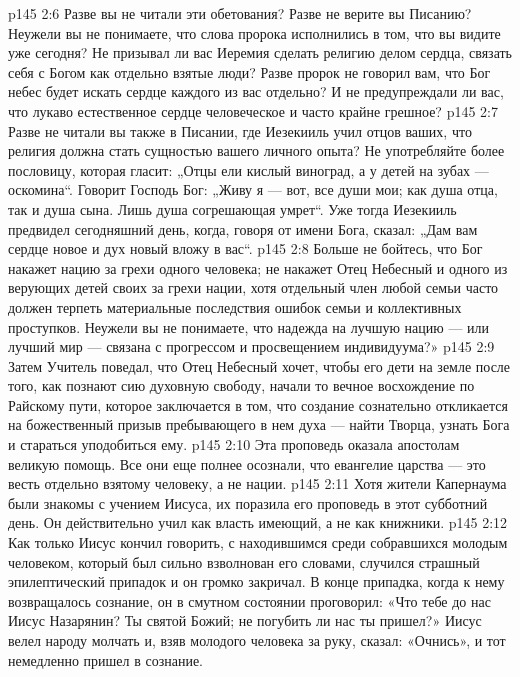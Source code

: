 \vs p145 2:6 Разве вы не читали эти обетования? Разве не верите вы Писанию? Неужели вы не понимаете, что слова пророка исполнились в том, что вы видите уже сегодня? Не призывал ли вас Иеремия сделать религию делом сердца, связать себя с Богом как отдельно взятые люди? Разве пророк не говорил вам, что Бог небес будет искать сердце каждого из вас отдельно? И не предупреждали ли вас, что лукаво естественное сердце человеческое и часто крайне грешное?
\vs p145 2:7 Разве не читали вы также в Писании, где Иезекииль учил отцов ваших, что религия должна стать сущностью вашего личного опыта? Не употребляйте более пословицу, которая гласит: „Отцы ели кислый виноград, а у детей на зубах --- оскомина“. Говорит Господь Бог: „Живу я --- вот, все души мои; как душа отца, так и душа сына. Лишь душа согрешающая умрет“. Уже тогда Иезекииль предвидел сегодняшний день, когда, говоря от имени Бога, сказал: „Дам вам сердце новое и дух новый вложу в вас“.
\vs p145 2:8 Больше не бойтесь, что Бог накажет нацию за грехи одного человека; не накажет Отец Небесный и одного из верующих детей своих за грехи нации, хотя отдельный член любой семьи часто должен терпеть материальные последствия ошибок семьи и коллективных проступков. Неужели вы не понимаете, что надежда на лучшую нацию --- или лучший мир --- связана с прогрессом и просвещением индивидуума?»
\vs p145 2:9 Затем Учитель поведал, что Отец Небесный хочет, чтобы его дети на земле после того, как познают сию духовную свободу, начали то вечное восхождение по Райскому пути, которое заключается в том, что создание сознательно откликается на божественный призыв пребывающего в нем духа --- найти Творца, узнать Бога и стараться уподобиться ему.
\vs p145 2:10 \pc Эта проповедь оказала апостолам великую помощь. Все они еще полнее осознали, что евангелие царства --- это весть отдельно взятому человеку, а не нации.
\vs p145 2:11 Хотя жители Капернаума были знакомы с учением Иисуса, их поразила его проповедь в этот субботний день. Он действительно учил как власть имеющий, а не как книжники.
\vs p145 2:12 \pc Как только Иисус кончил говорить, с находившимся среди собравшихся молодым человеком, который был сильно взволнован его словами, случился страшный эпилептический припадок и он громко закричал. В конце припадка, когда к нему возвращалось сознание, он в смутном состоянии проговорил: «Что тебе до нас Иисус Назарянин? Ты святой Божий; не погубить ли нас ты пришел?» Иисус велел народу молчать и, взяв молодого человека за руку, сказал: «Очнись», и тот немедленно пришел в сознание.
